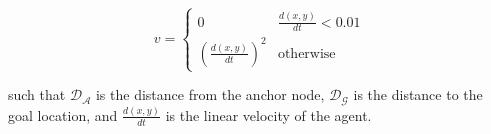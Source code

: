 \begin{equation}
	v = 
	\begin{cases}
		0 & \frac{d(x, y)}{dt} < 0.01 \\
		(\frac{d(x, y)}{dt})^2 & \text{otherwise}
	\end{cases}
\end{equation}

such that $\mathcal{D_A}$ is the distance from the anchor node, $\mathcal{D_G}$ is the distance to the goal location, and $\frac{d(x,y)}{dt}$ is the linear velocity of the agent. 